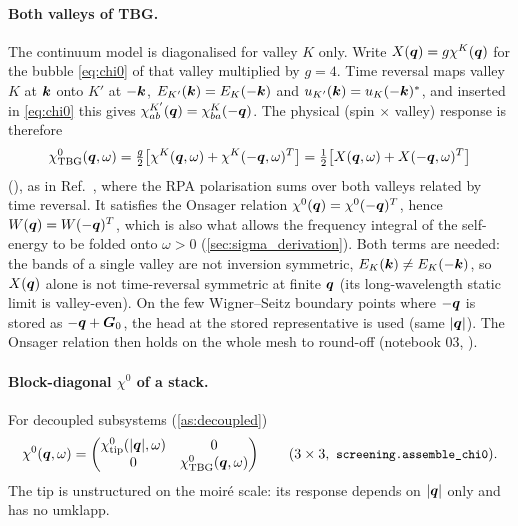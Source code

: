 \paragraph{Both valleys of TBG.}\label{sec:valleys}
The continuum model is diagonalised for valley $K$ only. Write $X(\bm q)=g\chi^K(\bm q)$ for the bubble
\eqref{eq:chi0} of that valley multiplied by $g=4$. Time reversal maps valley $K$ at $\bm k$ onto $K'$ at $-\bm k$,
$E_{K'}(\bm k)=E_K(-\bm k)$ and $u_{K'}(\bm k)=u_K(-\bm k)^*$, and inserted in \eqref{eq:chi0} this gives
$\chi^{K'}_{ab}(\bm q)=\chi^{K}_{ba}(-\bm q)$. The physical (spin $\times$ valley) response is therefore
\begin{equation}
\chi^0_{\rm TBG}(\bm q,\omega)=\tfrac{g}{2}\bigl[\chi^K(\bm q,\omega)+\chi^K(-\bm q,\omega)^T\bigr]
=\tfrac12\bigl[X(\bm q,\omega)+X(-\bm q,\omega)^T\bigr]
\label{eq:valleysym}
\end{equation}
(), as in Ref.~\cite{Wei2025}, where the RPA polarisation sums over both valleys
related by time reversal. It satisfies the Onsager relation $\chi^0(\bm q)=\chi^0(-\bm q)^T$, hence $W(\bm q)=W(-\bm q)^T$,
which is also what allows the frequency integral of the self-energy to be folded onto $\omega>0$
(\cref{sec:sigma_derivation}). Both terms are needed: the bands of a single valley are not inversion symmetric,
$E_K(\bm k)\neq E_K(-\bm k)$, so $X(\bm q)$ alone is not time-reversal symmetric at finite $\bm q$ (its long-wavelength
static limit is valley-even). On the few Wigner--Seitz boundary points where $-\bm q$ is stored as $-\bm q+\bm G_0$, the
head at the stored representative is used (same $|\bm q|$). The Onsager relation then holds on the whole mesh to
round-off (notebook 03, ).

\paragraph{Block-diagonal $\chi^0$ of a stack.} For decoupled subsystems (\cref{as:decoupled})
\begin{equation}
\chi^0(\bq,\omega)=\begin{pmatrix}\chi^0_{\rm tip}(|\bq|,\omega)&0\\0&\chi^0_{\rm TBG}(\bq,\omega)\end{pmatrix}
\qquad(3\times3,\ \code{screening.assemble\_chi0}).
\end{equation}
The tip is unstructured on the moir\'e scale: its response depends on $|\bm q|$ only and has no umklapp.

